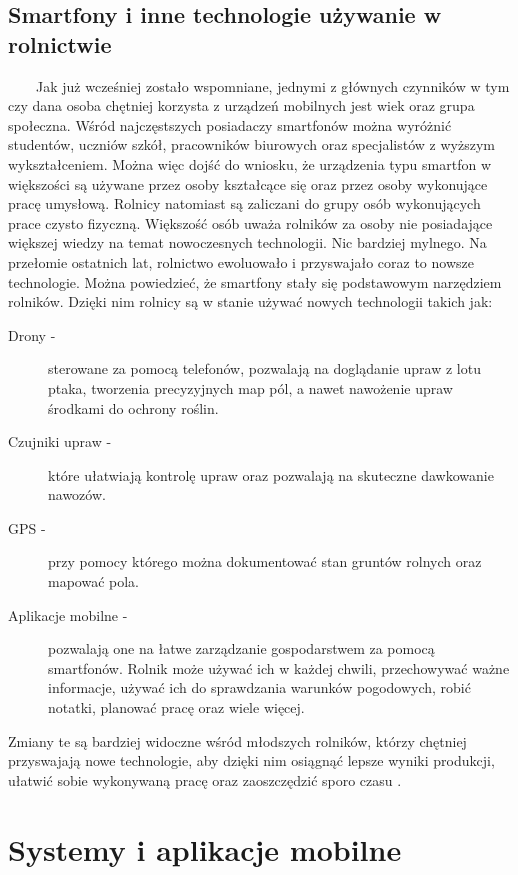\documentclass[a4paper,12pt,oneside]{book}
\begin{document}
	\section{Smartfony i inne technologie używanie w rolnictwie}
	\ \ \ \
	Jak już wcześniej zostało wspomniane, jednymi z głównych czynników w tym czy dana osoba chętniej korzysta z urządzeń mobilnych jest wiek oraz grupa społeczna. Wśród najczęstszych posiadaczy smartfonów można wyróżnić studentów, uczniów szkół, pracowników biurowych oraz specjalistów z wyższym wykształceniem. Można więc dojść do wniosku, że urządzenia typu smartfon w większości są używane przez osoby kształcące się oraz przez osoby wykonujące pracę umysłową. Rolnicy natomiast są zaliczani do grupy osób wykonujących prace czysto fizyczną. Większość osób uważa rolników za osoby nie posiadające większej wiedzy na temat nowoczesnych technologii. Nic bardziej mylnego. Na przełomie ostatnich lat, rolnictwo ewoluowało i przyswajało coraz to nowsze technologie. Można powiedzieć, że smartfony stały się podstawowym narzędziem rolników. Dzięki nim rolnicy są w stanie używać nowych technologii takich jak:
	
	\begin{description}
		\item[Drony -] sterowane za pomocą telefonów, pozwalają na doglądanie upraw z lotu ptaka, tworzenia precyzyjnych map pól, a nawet nawożenie upraw środkami do ochrony roślin.
		\item[Czujniki upraw -] które ułatwiają kontrolę upraw oraz pozwalają na skuteczne dawkowanie nawozów.
		\item[GPS -] przy pomocy którego można dokumentować stan gruntów rolnych oraz mapować pola.
		\item[Aplikacje mobilne -] pozwalają one na łatwe zarządzanie gospodarstwem za pomocą smartfonów. Rolnik może używać ich w każdej chwili, przechowywać ważne informacje, używać ich do sprawdzania warunków pogodowych, robić notatki, planować pracę oraz wiele więcej.
	\end{description}

	Zmiany te są bardziej widoczne wśród młodszych rolników, którzy chętniej przyswajają nowe technologie, aby dzięki nim osiągnąć lepsze wyniki produkcji, ułatwić sobie wykonywaną pracę oraz zaoszczędzić sporo czasu \cite{ref5}.
	
	\newpage
	\thispagestyle{empty}
	\chapter{Systemy i aplikacje mobilne}
\end{document}
